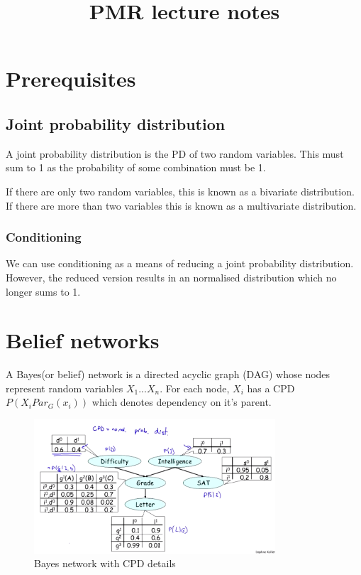 \documentclass[11pt]{report}
\begin{document}
\title{PMR lecture notes}
\maketitle

\chapter{Prerequisites}

\section{Joint probability distribution}
A joint probability distribution is the PD of two random variables. This must sum to 1 as the probability of some combination must be 1.

If there are only two random variables, this is known as a bivariate distribution. If there are more than two variables this is known as a multivariate distribution. 

\subsection{Conditioning}
We can use conditioning as a means of reducing a joint probability distribution. However, the reduced version results in an normalised distribution which no longer sums to 1. 

\chapter{Belief networks}

A Bayes(or belief) network is a directed acyclic graph (DAG) whose nodes represent random variables $X_1...X_n$. For each node, $X_i$ has a CPD $P(X_i  Par_G(x_i))$ which denotes dependency on it's parent.

\begin{figure}[H]
\centering
\includegraphics[width=90mm]{images/cpd_bayesnetwork.png}
\caption{Bayes network with CPD details}
\label{sensorymockup2}
\end{figure}
\end{document}

